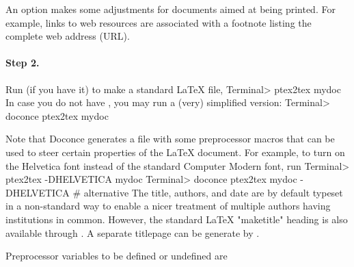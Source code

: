 \documentclass[%
oneside,                 %
final,                   %
10pt]{article}
\begin{document}
An option  makes some adjustments for documents
aimed at being printed. For example, links to web resources are
associated with a footnote listing the complete web address (URL).

\paragraph{Step 2.}
Run  (if you have it) to make a standard {\LaTeX} file,
\bsys
Terminal> ptex2tex mydoc
\esys
In case you do not have , you may run a (very) simplified version:
\bsys
Terminal> doconce ptex2tex mydoc
\esys

Note that Doconce generates a  file with some preprocessor macros
that can be used to steer certain properties of the {\LaTeX} document.
For example, to turn on the Helvetica font instead of the standard
Computer Modern font, run
\bsys
Terminal> ptex2tex -DHELVETICA mydoc
Terminal> doconce ptex2tex mydoc -DHELVETICA  # alternative
\esys
The title, authors, and date are by default typeset in a non-standard
way to enable a nicer treatment of multiple authors having
institutions in common. However, the standard {\LaTeX} "maketitle" heading
is also available through .
A separate titlepage can be generate by
.

Preprocessor variables to be defined or undefined are
\end{document}
